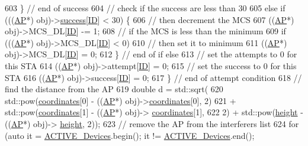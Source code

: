 \begin{DoxyCode}
{{603             \} \textcolor{comment}{// end of success}
604               \textcolor{comment}{// check if the success are less than 30%
605             \textcolor{keywordflow}{else} \textcolor{keywordflow}{if} (((\hyperlink{classAP}{AP}*) obj)->\hyperlink{classSTA_a8f2d6be8326b3e46fbf1599040bff750}{success}[\hyperlink{classSTA_a9376abb50969b5b16aeb5fb0e449e6f7}{ID}] < 30) \{
606                 \textcolor{comment}{// then decrement the MCS}
607                 ((\hyperlink{classAP}{AP}*) obj)->MCS\_DL[\hyperlink{classSTA_a9376abb50969b5b16aeb5fb0e449e6f7}{ID}] -= 1;
608                 \textcolor{comment}{// if the MCS is less than the minimum}
609                 \textcolor{keywordflow}{if} (((\hyperlink{classAP}{AP}*) obj)->MCS\_DL[\hyperlink{classSTA_a9376abb50969b5b16aeb5fb0e449e6f7}{ID}] < 0)
610                     \textcolor{comment}{// then set it to minimum}
611                     ((\hyperlink{classAP}{AP}*) obj)->MCS\_DL[\hyperlink{classSTA_a9376abb50969b5b16aeb5fb0e449e6f7}{ID}] = 0;
612             \} \textcolor{comment}{// end of if else}
613               \textcolor{comment}{// set the attempts to 0 for this STA     }
614             ((\hyperlink{classAP}{AP}*) obj)->attempt[\hyperlink{classSTA_a9376abb50969b5b16aeb5fb0e449e6f7}{ID}] = 0;
615             \textcolor{comment}{// set the success to 0 for this STA}
616             ((\hyperlink{classAP}{AP}*) obj)->success[\hyperlink{classSTA_a9376abb50969b5b16aeb5fb0e449e6f7}{ID}] = 0;
617         \} \textcolor{comment}{// end of attempt condition}
618           \textcolor{comment}{// find the distance from the AP    }
619         \textcolor{keywordtype}{double} d = std::sqrt(
620                 std::pow(\hyperlink{classSTA_aba57e1e65b70a3b6f556495e47f6838a}{coordinates}[0] - ((\hyperlink{classAP}{AP}*) obj)->\hyperlink{classSTA_aba57e1e65b70a3b6f556495e47f6838a}{coordinates}[0], 2)
621                         + std::pow(\hyperlink{classSTA_aba57e1e65b70a3b6f556495e47f6838a}{coordinates}[1] - ((\hyperlink{classAP}{AP}*) obj)->
      \hyperlink{classSTA_aba57e1e65b70a3b6f556495e47f6838a}{coordinates}[1],
622                                 2) + std::pow(\hyperlink{classSTA_a85ba9b72f68ceeef8c89f02806c71890}{height} - ((\hyperlink{classAP}{AP}*) obj)->
      \hyperlink{classSTA_a85ba9b72f68ceeef8c89f02806c71890}{height}, 2));
623         \textcolor{comment}{// remove the AP from the interferers list}
624         \textcolor{keywordflow}{for} (\textcolor{keyword}{auto} it = \hyperlink{classSTA_a536179d10f961ae6f7330b980a13668e}{ACTIVE\_Devices}.begin(); it != 
      \hyperlink{classSTA_a536179d10f961ae6f7330b980a13668e}{ACTIVE\_Devices}.end();
}}}
\end{DoxyCode}

